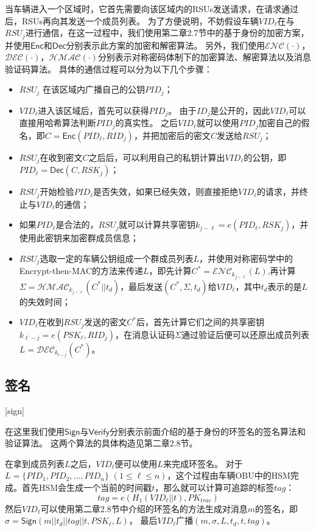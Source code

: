 当车辆进入一个区域时，它首先需要向该区域内的RSUs发送请求，在请求通过后，RSUs再向其发送一个成员列表。
为了方便说明，不妨假设车辆$VID_\ell$在与$RSU_j$进行通信，在这一过程中，我们使用第二章2.7节中的基于身份的加密方案，并使用$\mathsf{Enc}$和$\mathsf{Dec}$分别表示此方案的加密和解密算法\cite{boneh2001identity}。
另外，我们使用$\mathcal{ENC}(\cdot)$，$\mathcal{DEC}(\cdot)$，$\mathcal{HMAC}(\cdot)$分别表示对称密码体制下的加密算法、解密算法以及消息验证码算法。
具体的通信过程可以分为以下几个步骤：

\begin{itemize}
  \item $RSU_j$ 在该区域内广播自己的公钥$PID_j$；
  \item $VID_\ell$进入该区域后，首先可以获得$PID_j$。
  由于$ID_j$是公开的，因此$VID_\ell$可以直接用哈希算法判断$PID_j$的真实性。
  之后$VID_\ell$就可以使用$PID_j$加密自己的假名，即$C=\mathsf{Enc}(PID_\ell,RID_j)$，并把加密后的密文$C$发送给$RSU_j$；
  \item $RSU_j$在收到密文$C$之后后，可以利用自己的私钥计算出$VID_\ell$的公钥，即$PID_\ell=\mathsf{Dec}(C,RSK_j)$；
  \item $RSU_j$开始检验$PID_\ell$是否失效，如果已经失效，则直接拒绝$VID_\ell$的请求，并终止与$VID_\ell$的通信；
  \item 如果$PID_\ell$是合法的，$RSU_j$就可以计算共享密钥$k_{j-\ell}=e(PID_\ell,RSK_j)$，并使用此密钥来加密群成员信息；
  \item $RSU_j$选取一定的车辆公钥组成一个群成员列表$L$，并使用对称密码学中的Encrypt-then-MAC的方法来传递$L$，即先计算$C^*=\mathcal{ENC}_{k_{j-\ell}}(L)$,再计算$\Sigma=\mathcal{HMAC}_{k_{j-\ell}}(C^*||t_d)$，最后发送$(C^*,\Sigma,t_d)$给$VID_\ell$，其中$t_d$表示的是$L$的失效时间；
  \item $VID_\ell$在收到$RSU_j$发送的密文$C^*$后，首先计算它们之间的共享密钥$k_{\ell-j}=e(PSK_\ell,RID_j)$，在消息认证码$\Sigma$通过验证后便可以还原出成员列表$L=\mathcal{DEC}_{k_{i-j}}(C^*)$。
\end{itemize}

\subsection{签名}[sign]

在这里我们使用$\mathsf{Sign}$与$\mathsf{Verify}$分别表示前面介绍的基于身份的环签名的签名算法和验证算法。
这两个算法的具体构造见第二章2.8节。

在拿到成员列表$L$之后，$VID_\ell$便可以使用$L$来完成环签名。
对于$L=\{PID_1,PID_2,...,PID_n\}$ $(1\leq \ell\leq n)$，这个过程由车辆OBU中的HSM完成。首先HSM会生成一个当前的时间戳$t$，那么就可以计算可追踪的标签$tag$：
\begin{equation}
tag=e(H_1(VID_\ell||t),PK_{trac})
\end{equation}
然后$VID_\ell$可以使用第二章2.8节中介绍的环签名的方法生成对消息$m$的签名，即$\sigma=\mathsf{Sign}(m||t_d||tag||t,PSK_\ell,L)$，
最后$VID_\ell$广播$(m,\sigma,L,t_d,t,tag)$。

